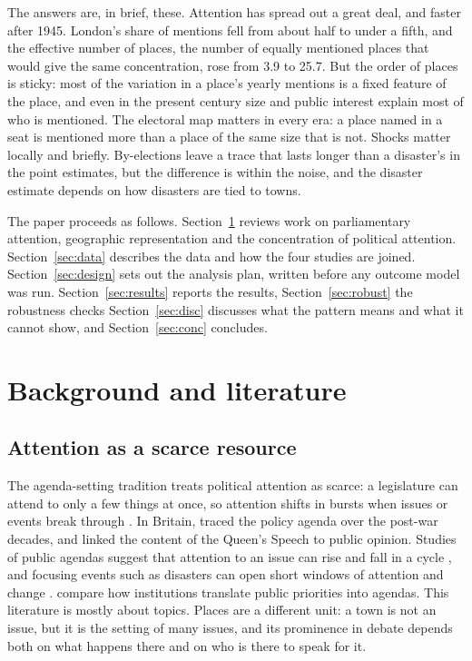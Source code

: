 \documentclass[11pt,a4paper]{article}
\begin{document}
The answers are, in brief, these. Attention has spread out a great deal, and faster after 1945. London's share of mentions fell from about half to under a fifth, and the effective number of places, the number of equally mentioned places that would give the same concentration, rose from 3.9 to 25.7. But the order of places is sticky: most of the variation in a place's yearly mentions is a fixed feature of the place, and even in the present century size and public interest explain most of who is mentioned. The electoral map matters in every era: a place named in a seat is mentioned more than a place of the same size that is not. Shocks matter locally and briefly. By-elections leave a trace that lasts longer than a disaster's in the point estimates, but the difference is within the noise, and the disaster estimate depends on how disasters are tied to towns.

The paper proceeds as follows. Section~\ref{sec:lit} reviews work on parliamentary attention, geographic representation and the concentration of political attention. Section~\ref{sec:data} describes the data and how the four studies are joined. Section~\ref{sec:design} sets out the analysis plan, written before any outcome model was run. Section~\ref{sec:results} reports the results, Section~\ref{sec:robust} the robustness checks Section~\ref{sec:disc} discusses what the pattern means and what it cannot show, and Section~\ref{sec:conc} concludes.

\section{Background and literature}\label{sec:lit}
\subsection{Attention as a scarce resource}
The agenda-setting tradition treats political attention as scarce: a legislature can attend to only a few things at once, so attention shifts in bursts when issues or events break through \citep{baumgartner1993,jones2005,kingdon1984}. In Britain, \citet{john2013} traced the policy agenda over the post-war decades, and \citet{jenningsjohn2009} linked the content of the Queen's Speech to public opinion. Studies of public agendas suggest that attention to an issue can rise and fall in a cycle \citep{downs1972}, and focusing events such as disasters can open short windows of attention and change \citep{birkland1998}. \citet{bevanjennings2014} compare how institutions translate public priorities into agendas. This literature is mostly about topics. Places are a different unit: a town is not an issue, but it is the setting of many issues, and its prominence in debate depends both on what happens there and on who is there to speak for it.
\end{document}
